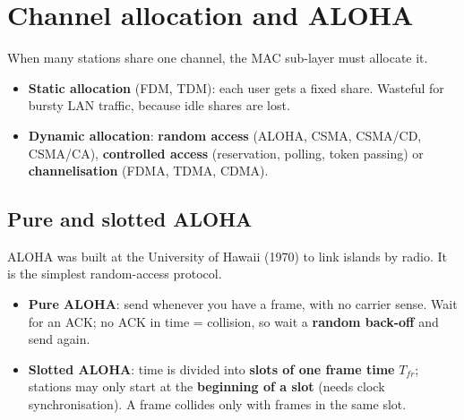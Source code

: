 \documentclass[10pt]{article}
\begin{document}
\section{Channel allocation and ALOHA}

When many stations share one channel, the MAC sub-layer must allocate it.
\begin{itemize}
\item \textbf{Static allocation} (FDM, TDM): each user gets a fixed share. Wasteful for bursty LAN traffic, because idle shares are lost.
\item \textbf{Dynamic allocation}: \textbf{random access} (ALOHA, CSMA, CSMA/CD, CSMA/CA), \textbf{controlled access} (reservation, polling, token passing) or \textbf{channelisation} (FDMA, TDMA, CDMA).
\end{itemize}

\subsection{Pure and slotted ALOHA}
ALOHA was built at the University of Hawaii (1970) to link islands by radio. It is the simplest random-access protocol.
\begin{itemize}
\item \textbf{Pure ALOHA}: send whenever you have a frame, with no carrier sense. Wait for an ACK; no ACK in time = collision, so wait a \textbf{random back-off} and send again.
\item \textbf{Slotted ALOHA}: time is divided into \textbf{slots of one frame time} $T_{fr}$; stations may only start at the \textbf{beginning of a slot} (needs clock synchronisation). A frame collides only with frames in the same slot.
\end{itemize}
\end{document}
